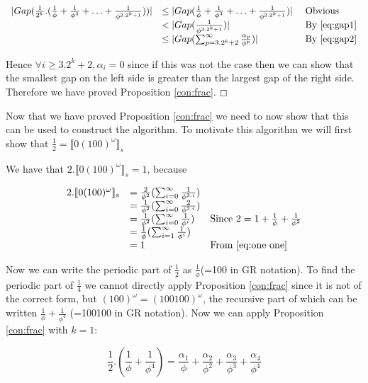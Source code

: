 \documentclass{cs4rep}
\begin{document}
\[ \begin{array}{rll}
|Gap(\frac{1}{2^{k}}.(\frac{1}{\phi}+\frac{1}{\phi^{4}} + \ldots + \frac{1}{\phi^{3.2^{k}+1}}))|  & \leq |Gap(\frac{1}{\phi}+\frac{1}{\phi^{4}} + \ldots + \frac{1}{\phi^{3.2^{k}+1}})| & \mbox{ Obvious} \\
& < |Gap(\frac{1}{\phi^{3.2^{k}+1}})| & \mbox{ By } \ref{eq:gap1} \\
& \leq | Gap(\sum_{p=3.2^{k}+2}^{\infty} \frac{\alpha_{p}}{\phi^{p}}) | & \mbox{ By } \ref{eq:gap2}
\end{array}\]

Hence $ \forall i \geq 3.2^{k}+2, \alpha_{i}=0$ since if this
was not the case then we can show that the smallest gap on the left
side is greater than the largest gap of the right side. Therefore we
have proved Proposition \ref{con:frac}. \hfill $ \boxempty $

Now that we have proved Proposition \ref{con:frac} we need to now show
that this can be used to construct the algorithm.  To motivate this
algorithm we will first show that $\frac{1}{2} = \llbracket
0(100)^{\omega} \rrbracket_{s}$

We have that $2.\llbracket 0(100)^{\omega} \rrbracket_{s} = 1 $, because

\[ \begin{array}{rll}
2.\llbracket 0(100)^{\omega} \rrbracket_{s} & = \frac{2}{\phi^{2}}(\sum_{i=0}^{\infty} \frac{1}{\phi^{3.i}}) \\
& = \frac{1}{\phi^{2}}(\sum_{i=0}^{\infty} \frac{2}{\phi^{3.i}}) \\
& = \frac{1}{\phi^{2}}(\sum_{i=0}^{\infty} \frac{1}{\phi^{i}}) & \mbox{Since } 2 = 1 + \frac{1}{\phi} + \frac{1}{\phi^{2}} \\
& =  \frac{1}{\phi}(\sum_{i=1}^{\infty} \frac{1}{\phi^{i}}) \\
& = 1 & \mbox{From } \ref{eq:one one}
\end{array} \]

Now we can write the periodic part of $\frac{1}{2}$ as
$\frac{1}{\phi}$(=100 in GR notation). To find the periodic part of
$\frac{1}{4}$ we cannot directly apply Proposition \ref{con:frac}
since it is not of the correct form, but $(100)^{\omega} =
(100100)^{\omega}$, the recursive part of which can be written
$\frac{1}{\phi}+ \frac{1}{\phi^{4}}$ (=100100 in GR notation). Now we
can apply Proposition \ref{con:frac} with $k=1$:

\[ \frac{1}{2}.(\frac{1}{\phi}+ \frac{1}{\phi^{4}}) = \frac{\alpha_{1}}{\phi} + \frac{\alpha_{2}}{\phi^{2}} + \frac{\alpha_{3}}{\phi^{3}} + \frac{\alpha_{4}}{\phi^{4}} \]
\end{document}
